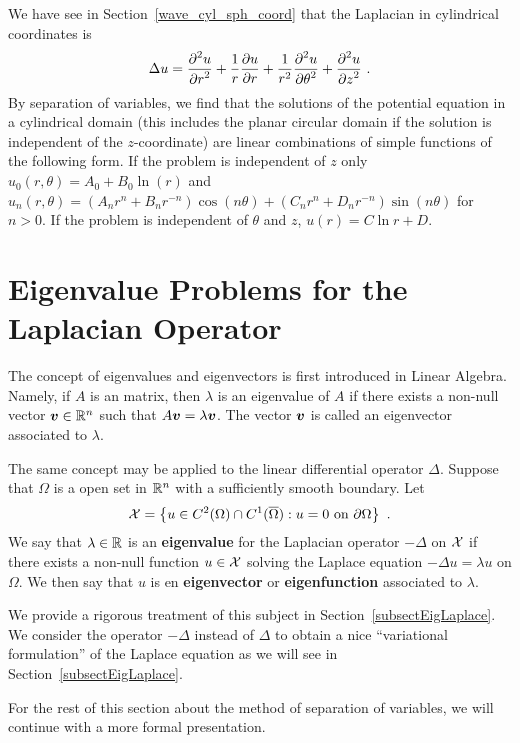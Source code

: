We have see in Section~\ref{wave_cyl_sph_coord} that the Laplacian in
cylindrical coordinates is
\[
\Delta u = \frac{\displaystyle \partial^{2}{u}} {\displaystyle \partial r^{2}} + \frac{1}{r} \frac{\partial{u}}{\partial r}
+ \frac{1}{r^2} \frac{\displaystyle \partial^{2}{u}} {\displaystyle \partial \theta^{2}} + \frac{\displaystyle \partial^{2}{u}} {\displaystyle \partial z^{2}} \ .
\]
By separation of variables, we find that the solutions of the
potential equation in a cylindrical domain (this includes the planar
circular domain if the solution is independent of the $z$-coordinate)
are linear combinations of simple functions of the following form.
If the problem is independent of $z$ only
$\displaystyle u_0(r,\theta) = A_0 + B_0 \ln(r)$
and
$\displaystyle u_n(r,\theta)
= \left(A_n r^n + B_n r^{-n}\right) \cos(n \theta)
+ \left(C_n r^n + D_n r^{-n}\right) \sin(n \theta)$
for $n > 0$.  If the problem is independent of $\theta$ and $z$,
$u(r) = C \ln r + D$.

\section{Eigenvalue Problems for the Laplacian Operator}
\label{sectEigLaplace}

The concept of eigenvalues and eigenvectors is first introduced in
Linear Algebra.  Namely, if $A$ is an \nn matrix, then 
$\lambda$ is an eigenvalue of $A$ if there exists a non-null vector
${\bm{v}}\in \mathbb{R}^n$ such that $A{\bm{v}} = \lambda {\bm{v}}$.  The vector
${\bm{v}}$ is called an eigenvector associated to $\lambda$.

The same concept may be applied to the linear differential operator
$\Delta$.  Suppose that $\Omega$ is a open set in $\mathbb{R}^n$ with a
sufficiently smooth boundary.  Let
\[
  {\cal X} = \left\{ u \in C^2(\Omega) \cap C^1(\overline{\Omega}) :
    u = 0 \ \text{on} \ \partial \Omega\right\} \ .
\]
We say that $\lambda \in \mathbb{R}$ is an
{\bfseries eigenvalue} for the Laplacian 
operator $-\Delta$ on $\cal X$ if there exists a non-null function
$u \in \cal X$ solving the Laplace equation
$- \Delta u = \lambda u$ on $\Omega$.
We then say that $u$ is en
{\bfseries eigenvector} or
{\bfseries eigenfunction} associated to
$\lambda$.

We provide a rigorous treatment of this subject in
Section~\ref{subsectEigLaplace}.  We consider the operator $-\Delta$
instead of $\Delta$ to obtain a nice ``variational formulation'' of
the Laplace equation as we will see in Section~\ref{subsectEigLaplace}.

For the rest of this section about the method of
separation of variables, we will continue with a more formal presentation.

